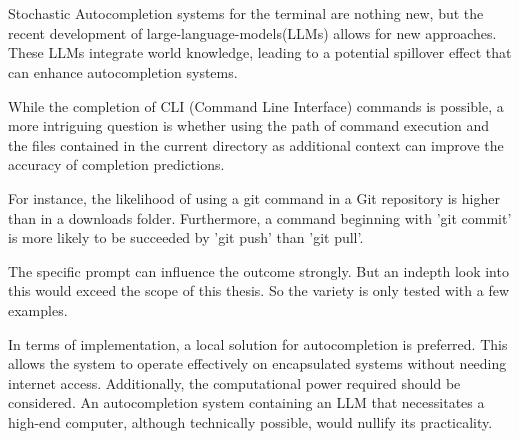 \section*{}





Stochastic Autocompletion systems for the terminal are nothing new, but the recent development of large-language-models(LLMs) allows for new approaches. These LLMs integrate world knowledge, leading to a potential spillover effect that can enhance autocompletion systems.


While the completion of CLI (Command Line Interface) commands is possible, a more intriguing question is whether using the path of command execution and the files contained in the current directory as additional context can improve the accuracy of completion predictions.

For instance, the likelihood of using a git command in a Git repository is higher than in a downloads folder. Furthermore, a command beginning with 'git commit' is more likely to be succeeded by 'git push' than 'git pull'.

The specific prompt can influence the outcome strongly. But an indepth look into this would exceed the scope of this thesis. So  the variety is only tested with a few examples.

In terms of implementation, a local solution for autocompletion is preferred. This allows the system to operate effectively on encapsulated systems without needing internet access. Additionally, the computational power required should be considered. An autocompletion system containing an LLM that necessitates a high-end computer, although technically possible, would nullify its practicality.



